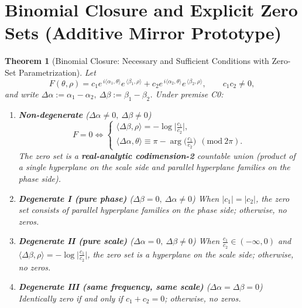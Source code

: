 \documentclass[11pt,a4paper]{article}
\newtheorem{theorem}{Theorem}[section]
\theoremstyle{remark}
\begin{document}
\section{Binomial Closure and Explicit Zero Sets (Additive Mirror Prototype)}

\begin{theorem}[Binomial Closure: Necessary and Sufficient Conditions with Zero-Set Parametrization]\label{thm:binomial}
Let
\begin{equation}
F(\theta,\rho)=c_1 e^{\,i\langle\alpha_1,\theta\rangle}e^{\,\langle\beta_1,\rho\rangle}
+c_2 e^{\,i\langle\alpha_2,\theta\rangle}e^{\,\langle\beta_2,\rho\rangle},
\qquad c_1c_2\ne0,
\end{equation}
and write $\Delta\alpha:=\alpha_1-\alpha_2,\ \Delta\beta:=\beta_1-\beta_2$. Under premise C0:

\begin{enumerate}
\item \textbf{Non-degenerate} ($\Delta\alpha\ne0,\ \Delta\beta\ne0$)
\begin{equation}
F=0\iff
\begin{cases}
\langle \Delta\beta,\rho\rangle = -\log\big|\frac{c_1}{c_2}\big|,\\[2mm]
\langle \Delta\alpha,\theta\rangle \equiv \pi-\arg\big(\frac{c_1}{c_2}\big)\ \ (\mathrm{mod}\ 2\pi).
\end{cases}
\end{equation}
The zero set is a \textbf{real-analytic codimension-2} countable union (product of a single hyperplane on the scale side and parallel hyperplane families on the phase side).

\item \textbf{Degenerate I (pure phase)} ($\Delta\beta=0,\ \Delta\alpha\ne0$)
When $|c_1|=|c_2|$, the zero set consists of parallel hyperplane families on the phase side; otherwise, no zeros.

\item \textbf{Degenerate II (pure scale)} ($\Delta\alpha=0,\ \Delta\beta\ne0$)
When $\frac{c_1}{c_2}\in(-\infty,0)$ and $\langle \Delta\beta,\rho\rangle=-\log\big|\frac{c_1}{c_2}\big|$, the zero set is a hyperplane on the scale side; otherwise, no zeros.

\item \textbf{Degenerate III (same frequency, same scale)} ($\Delta\alpha=\Delta\beta=0$)
Identically zero if and only if $c_1+c_2=0$; otherwise, no zeros.
\end{enumerate}
\end{theorem}
\end{document}
